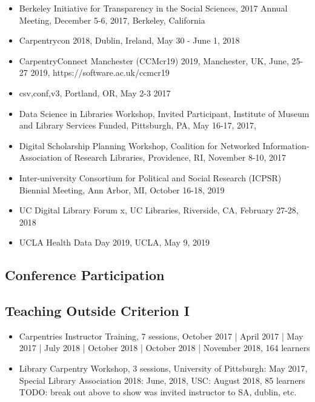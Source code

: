 \begin{itemize}[label={},leftmargin=!,labelindent=5pt,itemindent=-15pt]
  \item Berkeley Initiative for Transparency in the Social Sciences, 2017 Annual Meeting, December 5-6, 2017, Berkeley, California
  \item Carpentrycon 2018, Dublin, Ireland, May 30 - June 1, 2018
  \item CarpentryConnect Manchester (CCMcr19) 2019, Manchester, UK, June, 25-27 2019, https://software.ac.uk/ccmcr19
  \item csv,conf,v3, Portland, OR, May 2-3 2017
  \item Data Science in Libraries Workshop, Invited Participant, Institute of Museum and Library Services Funded, Pittsburgh, PA, May 16-17, 2017,
  \item Digital Scholarship Planning Workshop, Coalition for Networked Information-Association of Research Libraries, Providence, RI, November 8-10, 2017
  \item Inter-university Consortium for Political and Social Research (ICPSR) Biennial Meeting, Ann Arbor, MI, October 16-18, 2019
  \item UC Digital Library Forum x, UC Libraries, Riverside, CA, February 27-28, 2018
  \item UCLA Health Data Day 2019, UCLA, May 9, 2019
\end{itemize}


\subsection{Conference Participation}

\nocite{*}
\printbibliography[keyword={outlib-conf-part},title={Conference Participation},heading=none]


\subsection{Teaching Outside Criterion I}
\begin{itemize}[label={},leftmargin=!,labelindent=5pt,itemindent=-15pt]
  \item Carpentries Instructor Training, 7 sessions, October 2017 | April	2017 | May	2017 | July	2018 | October 2018 | October	2018 | November 2018,	164 learners
  \item Library Carpentry Workshop, 3 sessions, University of Pittsburgh: May	2017, Special Library Association 2018: June, 2018, USC: August	2018,	85 learners
  TODO: break out above to show was invited instructor to SA, dublin, etc.
\end{itemize}
